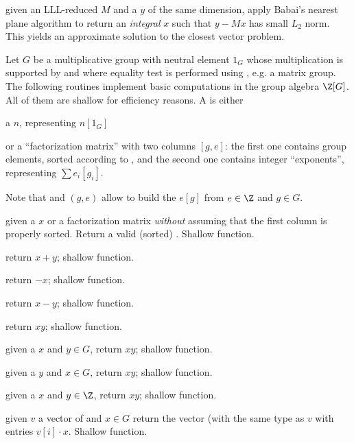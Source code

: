  given an LLL-reduced  $M$ and
a  $y$ of the same dimension, apply Babai's nearest plane algorithm
to return an \emph{integral} $x$ such that $y - Mx$ has small $L_2$ norm.
This yields an approximate solution to the closest vector problem.


Let $G$ be a multiplicative group with neutral element $1_G$ whose
multiplication is supported by  and where equality test is
performed using , e.g. a matrix group. The following
routines implement basic computations in the group algebra $\Z[G]$. All of
them are shallow for efficiency reasons. A  is either

\item a  $n$, representing $n[1_G]$

\item or a ``factorization matrix'' with two columns $[g,e]$: the first one
contains group elements, sorted according to , and the
second one contains integer ``exponents'', representing $\sum e_i [g_i]$.

Note that  and $(g,e)$ allow to build
the  $e[g]$ from $e\in \Z$ and $g\in G$.

 given a  $x$ or a factorization
matrix \emph{without} assuming that the first column is properly sorted.
Return a valid (sorted) . Shallow function.

 return $x+y$; shallow function.

 return $-x$; shallow function.

 return $x-y$; shallow function.

 return $xy$; shallow function.

 given a  $x$ and $y\in G$,
 return $xy$; shallow function.

 given a  $y$ and $x\in G$,
 return $xy$; shallow function.

 given a  $x$ and $y\in \Z$,
 return $xy$; shallow function.

 given $v$ a vector of  and $x\in
G$ return the vector (with the same type as $v$ with entries $v[i]\cdot x$.
Shallow function.

